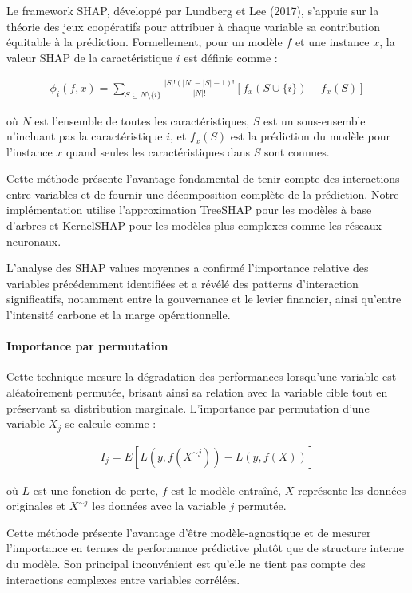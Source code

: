 Le framework SHAP, développé par Lundberg et Lee (2017), s'appuie sur la théorie des jeux coopératifs pour attribuer à chaque variable sa contribution équitable à la prédiction. Formellement, pour un modèle $f$ et une instance $x$, la valeur SHAP de la caractéristique $i$ est définie comme :

\begin{align}
\phi_i(f,x) = \sum_{S \subseteq N \setminus \{i\}} \frac{|S|!(|N|-|S|-1)!}{|N|!}[f_x(S \cup \{i\}) - f_x(S)]
\end{align}

où $N$ est l'ensemble de toutes les caractéristiques, $S$ est un sous-ensemble n'incluant pas la caractéristique $i$, et $f_x(S)$ est la prédiction du modèle pour l'instance $x$ quand seules les caractéristiques dans $S$ sont connues.

Cette méthode présente l'avantage fondamental de tenir compte des interactions entre variables et de fournir une décomposition complète de la prédiction. Notre implémentation utilise l'approximation TreeSHAP pour les modèles à base d'arbres et KernelSHAP pour les modèles plus complexes comme les réseaux neuronaux.

L'analyse des SHAP values moyennes a confirmé l'importance relative des variables précédemment identifiées et a révélé des patterns d'interaction significatifs, notamment entre la gouvernance et le levier financier, ainsi qu'entre l'intensité carbone et la marge opérationnelle.

\paragraph{Importance par permutation} 

Cette technique mesure la dégradation des performances lorsqu'une variable est aléatoirement permutée, brisant ainsi sa relation avec la variable cible tout en préservant sa distribution marginale. L'importance par permutation d'une variable $X_j$ se calcule comme :

\begin{align}
I_j = E[L(y, f(X^{\sim j})) - L(y, f(X))]
\end{align}

où $L$ est une fonction de perte, $f$ est le modèle entraîné, $X$ représente les données originales et $X^{\sim j}$ les données avec la variable $j$ permutée.

Cette méthode présente l'avantage d'être modèle-agnostique et de mesurer l'importance en termes de performance prédictive plutôt que de structure interne du modèle. Son principal inconvénient est qu'elle ne tient pas compte des interactions complexes entre variables corrélées.

